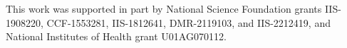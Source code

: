 \documentclass[nohyperref]{article}
\theoremstyle{plain}
\theoremstyle{definition}
\theoremstyle{remark}
\begin{document}
This work was supported in part by National Science Foundation grants IIS-1908220, CCF-1553281, IIS-1812641, DMR-2119103, and IIS-2212419, and National Institutes of Health grant U01AG070112.
\end{document}
